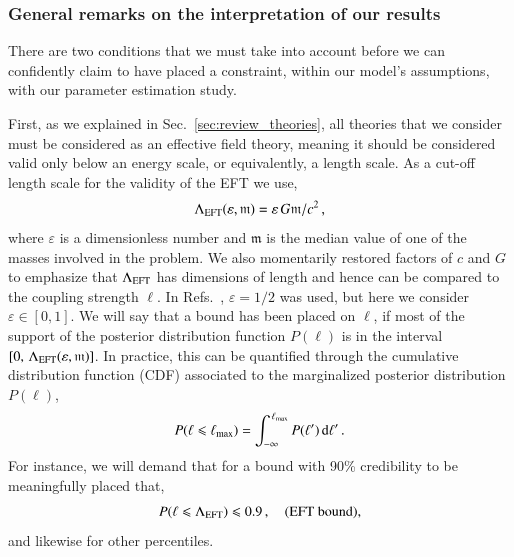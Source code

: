 \documentclass[twocolumn,prd,aps,superscriptaddress,preprintnumbers,tightenlines,showpacs,nofootinbib,amsfonts,amsmath,longbibliography]{revtex4-1}
\newcommand{\dd}{{\rm d}}
\begin{document}
\subsubsection{General remarks on the interpretation of our results}
\label{sec:remaks}

There are two conditions that we must take into account before
we can confidently claim to have placed a constraint, within our model's assumptions,
with our parameter estimation study.

First, as we explained in Sec.~\ref{sec:review_theories}, all theories that we
consider must be considered as an effective field theory, meaning it should be
considered valid only below an energy scale, or equivalently, a length scale.
%
As a cut-off length scale for the validity of the EFT we use,
%
\begin{equation}
\Lambda_{\rm EFT} (\varepsilon, \mathfrak{m}) = \varepsilon \, G \mathfrak{m} / c^2 \,,
\label{eq:def_cutoff}
\end{equation}
%
where $\varepsilon$ is a dimensionless number and $\mathfrak{m}$ is the median
value of one of the masses involved in the problem.
%
We also momentarily restored factors of $c$ and $G$ to emphasize that $\Lambda_{\rm EFT}$ has
dimensions of length and hence can be compared to the coupling strength $\ell$.
%
In Refs.~\cite{Nair:2019iur,Perkins:2021mhb,Lyu:2022gdr}, $\varepsilon = 1/2$ was used,
but here we consider $\varepsilon \in [0, 1]$.
%
We will say that a bound has been placed on $\ell$, if most of the support of
the posterior distribution function $P(\ell)$ is in the interval
$[0, \, \Lambda_{\rm EFT}(\varepsilon, \mathfrak{m})]$.
%
In practice, this can be quantified through the cumulative distribution function
(CDF) associated to the marginalized posterior distribution $P(\ell)$,
%
\begin{equation}
P(\ell \leqslant \ell_{\rm max}) = \int_{-\infty}^{\,\ell_{\rm max}} P(\ell') \, \dd \ell'\,.
\label{eq:def_cdf}
\end{equation}
%
For instance, we will demand that for a bound with 90\% credibility to be meaningfully placed that,
%
\begin{equation}
P(\ell \leqslant \Lambda_{\rm EFT}) \leqslant 0.9 \,,
\quad \textrm{(EFT bound)},
\label{eq:eft_bound}
\end{equation}
%
and likewise for other percentiles.
\end{document}
